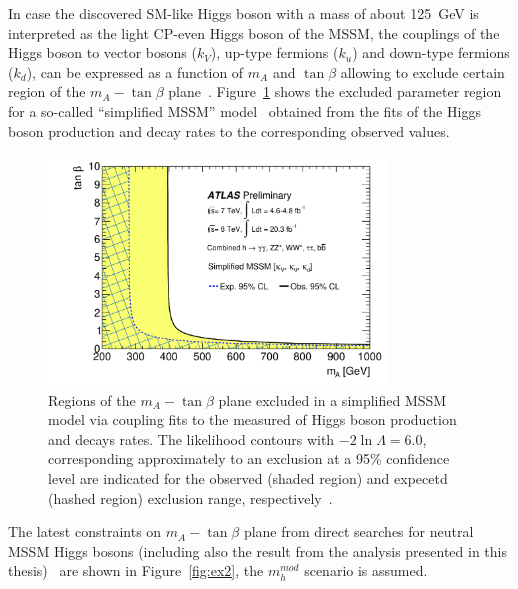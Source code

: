 In case the discovered SM-like Higgs boson with a mass of about 125~GeV is interpreted as the light CP-even Higgs boson of the MSSM, the couplings of the Higgs boson 
to vector bosons ($k_V$), up-type fermions ($k_u$) and down-type fermions ($k_d$), can be expressed as a function of  $m_A $ and $\tan\beta$
allowing to exclude certain region of the  $m_A - \tan\beta$ plane~\cite{AtlasConstraint}. Figure~\ref{fig:ex1} shows the 
excluded parameter region for a so-called ``simplified MSSM'' model~\cite{sympleMSSM1,sympleMSSM2}
obtained from the fits of the  Higgs boson production and decay rates to the corresponding observed values.

 
\begin{figure}[tp]
     \begin{center}

            \includegraphics[width=0.8\textwidth]{figure/limits/constraintAtlas.pdf}

    \end{center}
    \caption{Regions of the  $m_A - \tan\beta$ plane excluded in a simplified MSSM model via coupling fits to the measured
	of Higgs boson production and decays rates. The	likelihood contours with  $−2 \ln \Lambda = 6.0$, 
	corresponding approximately to an exclusion at a 95\% confidence level 	are indicated for the observed (shaded region)
	and expecetd (hashed region)  exclusion range, respectively~\cite{AtlasConstraint}.}

   \label{fig:ex1}
\end{figure}


The latest constraints on $m_A - \tan\beta$  plane from direct searches for neutral MSSM Higgs bosons (including 
also the result from the analysis presented in this thesis)~\cite{}  are  shown in Figure~\ref{fig:ex2}, the 
$m_h^{mod}$ scenario is assumed. 



